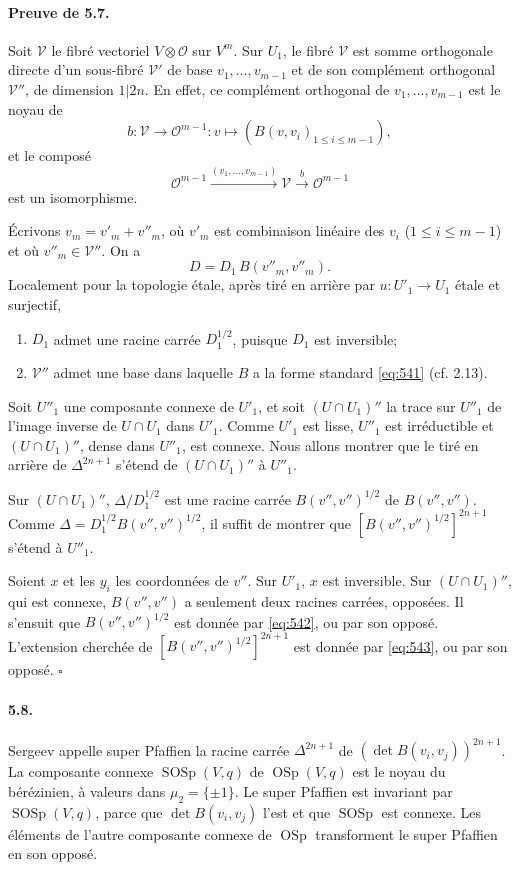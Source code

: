 \documentclass[11pt]{article}
\newcommand{\OSp}{\operatorname{OSp}}
\newcommand{\SOSp}{\operatorname{SOSp}}
\newcommand{\calO}{\mathcal O}
\begin{document}
\paragraph{Preuve de 5.7.}
Soit $\mathcal V$ le fibré vectoriel $V\otimes\calO$ sur $V^m$. Sur $U_1$, le fibré $\mathcal V$ est somme orthogonale directe d'un sous-fibré $\mathcal V'$ de base $v_1,\ldots,v_{m-1}$ et de son complément orthogonal $\mathcal V''$, de dimension $1|2n$. En effet, ce complément orthogonal de $v_1,\ldots,v_{m-1}$ est le noyau de
\[
b:\mathcal V\longrightarrow\calO^{m-1}:v\longmapsto(B(v,v_i)_{1\le i\le m-1}),
\]
et le composé
\[
\calO^{m-1}\xrightarrow{(v_1,\ldots,v_{m-1})}\mathcal V\xrightarrow{b}\calO^{m-1}
\]
est un isomorphisme.

Écrivons $v_m=v'_m+v''_m$, où $v'_m$ est combinaison linéaire des $v_i$ ($1\le i\le m-1$) et où $v''_m\in\mathcal V''$. On a
\[
D=D_1\,B(v''_m,v''_m).
\]
Localement pour la topologie étale, après tiré en arrière par $u:U'_1\to U_1$ étale et surjectif,
\begin{enumerate}[label=(\alph*)]
\item $D_1$ admet une racine carrée $D_1^{1/2}$, puisque $D_1$ est inversible;
\item $\mathcal V''$ admet une base dans laquelle $B$ a la forme standard \eqref{eq:541} (cf. 2.13).
\end{enumerate}
Soit $U''_1$ une composante connexe de $U'_1$, et soit $(U\cap U_1)''$ la trace sur $U''_1$ de l'image inverse de $U\cap U_1$ dans $U'_1$. Comme $U'_1$ est lisse, $U''_1$ est irréductible et $(U\cap U_1)''$, dense dans $U''_1$, est connexe. Nous allons montrer que le tiré en arrière de $\Delta^{2n+1}$ s'étend de $(U\cap U_1)''$ à $U''_1$.

Sur $(U\cap U_1)''$, $\Delta/D_1^{1/2}$ est une racine carrée $B(v'',v'')^{1/2}$ de $B(v'',v'')$. Comme $\Delta=D_1^{1/2}B(v'',v'')^{1/2}$, il suffit de montrer que $[B(v'',v'')^{1/2}]^{2n+1}$ s'étend à $U''_1$.

Soient $x$ et les $y_i$ les coordonnées de $v''$. Sur $U'_1$, $x$ est inversible. Sur $(U\cap U_1)''$, qui est connexe, $B(v'',v'')$ a seulement deux racines carrées, opposées. Il s'ensuit que $B(v'',v'')^{1/2}$ est donnée par \eqref{eq:542}, ou par son opposé. L'extension cherchée de $[B(v'',v'')^{1/2}]^{2n+1}$ est donnée par \eqref{eq:543}, ou par son opposé. \hfill $\square$

\paragraph{5.8.}
Sergeev appelle super Pfaffien la racine carrée $\Delta^{2n+1}$ de $(\det B(v_i,v_j))^{2n+1}$. La composante connexe $\SOSp(V,q)$ de $\OSp(V,q)$ est le noyau du bérézinien, à valeurs dans $\mu_2=\{\pm1\}$. Le super Pfaffien est invariant par $\SOSp(V,q)$, parce que $\det B(v_i,v_j)$ l'est et que $\SOSp$ est connexe. Les éléments de l'autre composante connexe de $\OSp$ transforment le super Pfaffien en son opposé.
\end{document}
